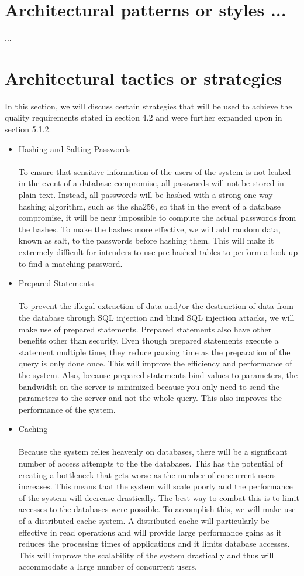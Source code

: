 \documentclass[a4paper]{article}
\begin{document}
    
\section{Architectural patterns or styles ...}
	...\\
\section{Architectural tactics or strategies}
In this section, we will discuss certain strategies that will be used to achieve the quality requirements stated in section 4.2 and were further expanded upon in section 5.1.2.
\begin{itemize}
	\item Hashing and Salting Passwords \\\\
	To ensure that sensitive information of the users of the system is not leaked in the event of a database compromise, all passwords will not be stored in plain text. Instead, all passwords will be hashed with a strong one-way hashing algorithm, such as the sha256, so that in the event of a database compromise, it will be near impossible to compute the actual passwords from the hashes. To make the hashes more effective, we will add random data, known as salt, to the passwords before hashing them. This will make it extremely difficult for intruders to use pre-hashed tables to perform a look up to find a matching password.
	\\
	\item Prepared Statements \\\\
	To prevent the illegal extraction of data and/or the destruction of data from the database through SQL injection and blind SQL injection attacks, we will make use of prepared statements. Prepared statements also have other benefits other than security. Even though prepared statements execute a statement multiple time, they reduce parsing time as the preparation of the query is only done once. This will improve the efficiency and performance of the system. Also, because prepared statements bind values to parameters, the bandwidth on the server is minimized because you only need to send the parameters to the server and not the whole query. This also improves the performance of the system.
	\\
	\item Caching \\\\
	Because the system relies heavenly on databases, there will be a significant number of access attempts to the the databases. This has the potential of creating a bottleneck that gets worse as the number of concurrent users increases. This means that the system will scale poorly and the performance of the system will decrease drastically. The best way to combat this is to limit accesses to the databases were possible. To accomplish this, we will make use of a distributed cache system. A distributed cache will particularly be effective in read operations and will provide large performance gains as it reduces the processing times of applications and it limits database accesses. This will improve the scalability of the system drastically and thus will accommodate a large number of concurrent users. 

\end{itemize}
\end{document}
